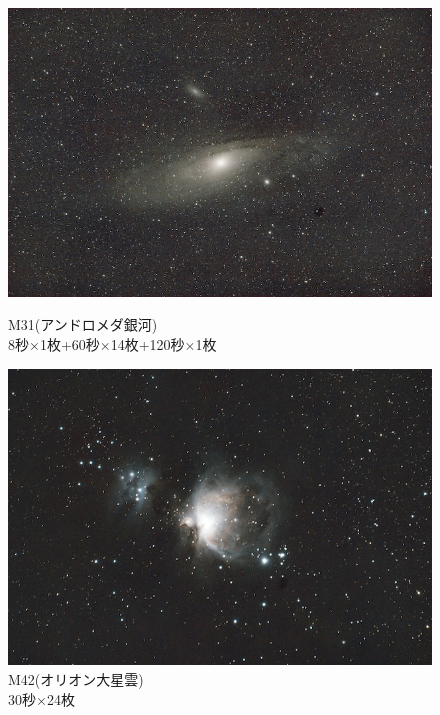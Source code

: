 \begin{figure}[H]
  \centering
  \begin{minipage}{0.48\linewidth}
    \centering
    \includegraphics[width=\linewidth]{sections/Kokubun/pictures/M31.jpg}
    \caption{M31(アンドロメダ銀河)\\
    8秒×1枚+60秒×14枚+120秒×1枚}
    \label{M31}
  \end{minipage}
  \begin{minipage}{0.48\linewidth}
    \centering
    \includegraphics[width=\linewidth]{sections/Kokubun/pictures/M42.jpg}
    \caption{M42(オリオン大星雲)\\
    30秒×24枚}
    \label{M42}
  \end{minipage}
\end{figure}


